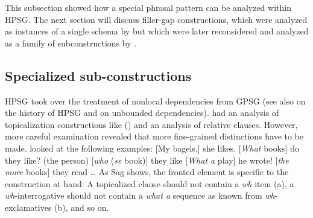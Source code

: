 \documentclass[output=paper
	        ,collection
	        ,collectionchapter
 	        ,biblatex
                ,babelshorthands
                ,newtxmath
                ,draftmode
                ,colorlinks, citecolor=brown
]{langscibook}
\begin{document}



This subsection showed how a special phrasal pattern can be analyzed within HPSG. The next section
will discuss filler-gap constructions, which were analyzed as instances of a single schema by
\citet{ps2} but which were later reconsidered and analyzed as a family of subconstructions by
\citet{Sag97a,Sag2010b}.

\subsection{Specialized sub-constructions}

HPSG took over the treatment of nonlocal dependencies from GPSG \citep{Gazdar81a} (see also
 on the history of HPSG and  on
unbounded dependencies). \citet[Chapters~4 and~5]{ps2} had
an analysis of topicalization constructions like () and an analysis of relative
clauses. However, more careful examination revealed that more fine-grained distinctions have to be
made. \citet[]{Sag2010b} looked at the following examples:
\settowidth{}
\eal
\ex {}[My bagels,] she likes.                           
\ex {}[\emph{What} books] do they like?                  
\ex (the person) [\emph{who} (\emph{se} book)] they like  
\ex {}[\emph{What a} play] he wrote!                     
\ex {}[\emph{the more} books] they read \ldots          {}
\zl
As Sag shows, the fronted element is specific to the construction at hand:
\eal
{}
\zl
A topicalized clause should not contain a \emph{wh} item (a), a \emph{wh}-interrogative should not
contain a \emph{what a} sequence as known from \emph{wh}-exclamatives (b), and so on.
\end{document}

